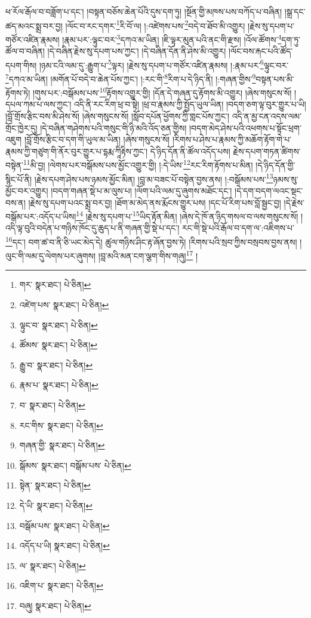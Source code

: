 ཕ་རོལ་རྒོལ་བ་བཟློག་པ་དང་། །བསྟན་བཅོས་ཆེན་པོའི་དུས་དག་ཏུ། །སྔོན་གྱི་མཁས་པས་བཀོད་པ་བཞིན། །སྒྲ་དང་ཚད་མའང་སྨྲ་བར་བྱ། །ལོང་བ་རང་དགར་\footnote{གར་  སྣར་ཐང་།  པེ་ཅིན། }རི་བོ་ལ། །:འཛེགས་པས་\footnote{འཛེག་པས་  སྣར་ཐང་།  པེ་ཅིན། }བདེ་བ་ཐོབ་མི་འགྱུར། །རྗེས་སུ་དཔག་པ་གཙོར་འཛིན་རྣམས། །རྣམ་པར་:ལྟུང་བར་\footnote{ལྟུང་བ་  སྣར་ཐང་།  པེ་ཅིན། }དཀའ་མ་ཡིན། །ཇི་ལྟར་མུན་པའི་ནང་གི་རྫས། །འོལ་ཚོགས་\footnote{ཚོམས་  སྣར་ཐང་།  པེ་ཅིན། }དག་ཏུ་ཚོལ་བ་བཞིན། །དེ་བཞིན་རྗེས་སུ་དཔག་པས་ཀྱང་། །དེ་བཞིན་དོན་ནི་ཤེས་མི་འགྱུར། །ལོང་བས་རྐང་པའི་ཚོད་དཔག་གིས། །ཉམ་ངའི་ལམ་དུ་:རྒྱུག་པ་\footnote{རྒྱུ་བ་  སྣར་ཐང་།  པེ་ཅིན། }ལྟར། །རྗེས་སུ་དཔག་པ་གཙོར་འཛིན་རྣམས། །:རྣམ་པར་\footnote{རྣམ་པ་  སྣར་ཐང་།  པེ་ཅིན། }ལྟུང་བར་\footnote{བ་  སྣར་ཐང་།  པེ་ཅིན། }དཀའ་མ་ཡིན། །མགོན་པོ་བདེ་བ་ཆེན་པོས་ཀྱང་། །:རང་གི་\footnote{རང་གིས་  སྣར་ཐང་།  པེ་ཅིན། }རིག་པ་དེ་ཉིད་ནི། །:གཞན་གྱིས་\footnote{གཞན་གྱི་  སྣར་ཐང་།  པེ་ཅིན། }བསྟན་པས་མི་རྟོགས་ཏེ། །གུས་པར་:བསྒོམས་པས་\footnote{སྒོམས་  སྣར་ཐང་། བསྒོམ་པས་  པེ་ཅིན། }རྟོགས་འགྱུར་གྱི། །དོན་དེ་གཞན་དུ་རྟོགས་མི་འགྱུར། །ཞེས་གསུངས་སོ། །དཔལ་ཀམ་པ་ལས་ཀྱང་། འདི་ནི་རང་རིག་ཕྲ་བ་སྟེ། །ཕྲ་བ་རྣམས་ཀྱི་སྤྱོད་ཡུལ་ཡིན། །བདག་ཅག་ལྟ་བུར་གྱུར་པ་ཡི། །བློ་གྲོས་རྩིང་བས་མི་ཤེས་སོ། །ཞེས་གསུངས་སོ། །སློབ་དཔོན་ཕྱོགས་ཀྱི་གླང་པོས་ཀྱང་། འདི་ན་མྱ་ངན་འདས་ལམ་གྲོང་ཁྱེར་དུ། །དེ་བཞིན་གཤེགས་པའི་གསུང་གི་ཉི་མའི་འོད་ཅན་གྱིས། །བདག་མེད་ཤེས་པའི་འཕགས་པ་སྟོང་ཕྲག་འཇུག །བློ་གྲོས་རྩིང་བ་དག་གི་ཡུལ་མ་ཡིན། །ཞེས་གསུངས་སོ། །རིགས་པ་ཤེས་པ་རྣམས་ཀྱི་མཆོག་རྟོག་གེ་པ་རྣམས་ཀྱི་གཙུག་གི་ནོར་བུར་གྱུར་པ་དྷརྨ་ཀཱིརྟིས་ཀྱང་། དེ་ཉིད་དོན་ནི་ཚོལ་འདོད་པས། རྗེས་དཔག་གཏན་ཚིགས་བསྟེན་\footnote{སྟེན་  སྣར་ཐང་།  པེ་ཅིན། }མི་བྱ། །ལེགས་པར་བསྒོམས་པས་མྱོང་འགྱུར་གྱི། །:དེ་ཡིས་\footnote{དེ་ཡི་  སྣར་ཐང་།  པེ་ཅིན། }རང་རིག་རྟོགས་པ་མིན། །དེ་ཉིད་དོན་གྱི་སྙིང་པོ་ནི། །རྗེས་དཔག་ཤེས་པས་ཉམས་མྱོང་མིན། །བླ་མ་བཟང་པོ་བསྟེན་བྱས་ནས། །:བསྒོམས་པས་\footnote{བསྒོམ་པས་  སྣར་ཐང་།  པེ་ཅིན། }ཉམས་སུ་མྱོང་བར་འགྱུར། །བདག་གཞན་སྡེ་པ་མ་ལུས་པ། །ལོག་པའི་ལམ་དུ་ཞུགས་མཐོང་དང་། །དེ་དག་བདག་ལའང་སྡང་བས་ན། །རྗེས་སུ་དཔག་པའང་སྨྲ་བར་བྱ། །ཐོག་མ་མེད་ནས་རྨོངས་གྱུར་པས། །དང་པོ་རིག་པས་བློ་སྦྱང་བྱ། །དེ་རྗེས་བསྒོམ་པར་:འདོད་པ་ཡིས།\footnote{འདོད་པ་ཡི།  སྣར་ཐང་།  པེ་ཅིན། } །རྗེས་སུ་དཔག་པ་\footnote{ལ་  སྣར་ཐང་།  པེ་ཅིན། }ཡིད་རྟོན་མིན། །ཞེས་དེ་ཁོ་ན་ཉིད་གསལ་བ་ལས་གསུངས་སོ། །འདི་ལྟ་བུའི་བདེན་པ་གཉིས་ཁོང་དུ་ཆུད་པ་ནི་གཞན་གྱི་སྡེ་པ་དང་། རང་གི་སྡེ་པའི་རྒོལ་བ་དག་ལ་:འཇིགས་པ་\footnote{འཇིག་པ་  སྣར་ཐང་།  པེ་ཅིན། }དང་། བག་ཚ་བ་ནི་ཅི་ཡང་མེད་དེ། ཚུལ་གཉིས་ཤིང་རྟ་ཞོན་བྱས་ཏེ། །རིགས་པའི་སྲབ་ཀྱིས་བསྲབས་བྱས་ནས། །ལུང་གི་ལམ་དུ་ལེགས་པར་ཞུགས། །བླ་མའི་མན་ངག་ལྕག་གིས་གཞུ།\footnote{བཞུ།  སྣར་ཐང་།  པེ་ཅིན། } །
